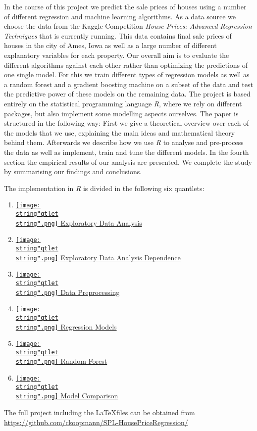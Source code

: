 In the course of this project we predict the sale prices of houses using a number of different regression and machine learning algorithms. As a data source we choose the data from the Kaggle Competition \textit{House Prices: Advanced Regression Techniques} that is currently running. This data contains final sale prices of houses in the city of Ames, Iowa as well as a large number of different explanatory variables for each property. Our overall aim is to evaluate the different algorithms against each other rather than optimizing the predictions of one single model. For this we train different types of regression models as well as a random forest and a gradient boosting machine on a subset of the data and test the predictive power of these models on the remaining data. The project is based entirely on the statistical programming language \textit{R}, where we rely on different packages, but also implement some modelling aspects ourselves. The paper is structured in the following way: First we give a theoretical overview over each of the models that we use, explaining the main ideas and mathematical theory behind them. Afterwards we describe how we use \textit{R} to  analyse and pre-process the data as well as implement, train and tune the different models. In the fourth section the empirical results of our analysis are presented. We complete the study by summarising our findings and conclusions. 


The implementation in \textit{R} is divided in the following six quantlets:
\begin{enumerate}
\item \href{https://github.com/ckoopmann/SPL-HousePriceRegression/tree/master/quantlets/Exploratory_Data_Analysis}{\texttt{[image: \\string"qtlet\\string".png]} Exploratory Data Analysis}
\item \href{https://github.com/ckoopmann/SPL-HousePriceRegression/tree/master/quantlets/Exploratory_Data_Analysis_Dependence}{\texttt{[image: \\string"qtlet\\string".png]} Exploratory Data Analysis Dependence}
\item \href{https://github.com/ckoopmann/SPL-HousePriceRegression/tree/master/quantlets/Data_Preprocessing}{\texttt{[image: \\string"qtlet\\string".png]} Data Preprocessing}
\item \href{https://github.com/ckoopmann/SPL-HousePriceRegression/tree/master/quantlets/Regression_Models}{\texttt{[image: \\string"qtlet\\string".png]} Regression Models}
\item \href{https://github.com/ckoopmann/SPL-HousePriceRegression/tree/master/quantlets/Random_Forest}{\texttt{[image: \\string"qtlet\\string".png]} Random Forest}
\item \href{https://github.com/ckoopmann/SPL-HousePriceRegression/tree/master/quantlets/Model_Comparison}{\texttt{[image: \\string"qtlet\\string".png]} Model Comparison}
\end{enumerate}
The full project including the \LaTeX files can be obtained from \href{https://github.com/ckoopmann/SPL-HousePriceRegression/}{https://github.com/ckoopmann/SPL-HousePriceRegression/}
